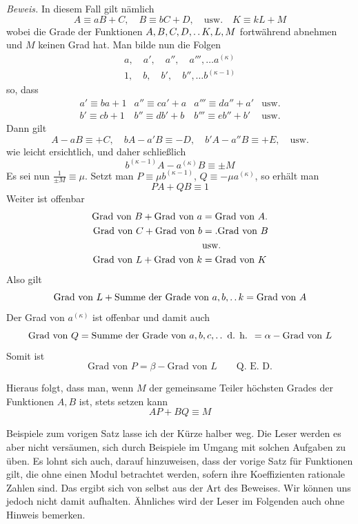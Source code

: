\emph{Beweis.} In diesem Fall gilt nämlich
\[
A\equiv aB+C,\quad B\equiv bC+D,\quad\text{usw.}\quad K\equiv kL+M
\]
wobei die Grade der Funktionen $A,B,C,D,\mathinner{.\,.} K,L,M$ fortwährend abnehmen und $M$ keinen Grad hat. Man bilde nun die Folgen
\[
\begin{gathered}
a,\quad a',\quad a'',\quad a''',\ldots a^{(\kappa)}\\
1,\quad b,\quad b',\quad b'',\ldots b^{(\kappa-1)}
\end{gathered}
\]
so, dass
\[
\begin{array}{llll}
a'\equiv ba+1&a''\equiv ca'+a&a'''\equiv da''+a'&\text{usw.}\\
b'\equiv cb+1&b''\equiv db'+b&b'''\equiv eb''+b'&\text{usw.}
\end{array}
\]
Dann gilt
\[
A-aB\equiv+C,\quad bA-a'B\equiv-D,\quad b'A-a''B\equiv+E,\quad\text{usw.}
\]
wie leicht ersichtlich, und daher schließlich
\[
b^{(\kappa-1)}A-a^{(\kappa)}B\equiv\pm M
\]
Es sei nun $\frac1{\pm M}\equiv\mu$. Setzt man $P\equiv\mu b^{(\kappa-1)}$, $Q\equiv-\mu a^{(\kappa)}$, so erhält man
\[
PA+QB\equiv1
\]
Weiter ist offenbar
\[
\begin{aligned}
\text{Grad von }B+\text{Grad von }a&=\text{Grad von }A.\\
\text{Grad von }C+\text{Grad von }b&=\mathbin{.}\text{Grad von }B\\
&\text{usw.}\\
\text{Grad von }L+\text{Grad von }k&=\text{Grad von }K
\end{aligned}
\]
Also gilt
\[
\text{Grad von }L+\text{Summe der Grade von }a,b,\mathinner{.\,.} k=\text{Grad von }A
\]
Der Grad von $a^{(\kappa)}$ ist offenbar und damit auch
\[
\text{Grad von }Q=\text{Summe der Grade von }a,b,c,\mathinner{.\,.}\text{ d. h. }=\alpha-\text{Grad von }L
\]
Somit ist
\[
\text{Grad von }P=\beta-\text{Grad von }L\qquad\text{Q. E. D.}
\]

Hieraus folgt, dass man, wenn $M$ der gemeinsame Teiler höchsten Grades der Funktionen $A,B$ ist, stets setzen kann
\[
AP+BQ\equiv M
\]

Beispiele zum vorigen Satz lasse ich der Kürze halber weg. Die Leser werden es aber nicht versäumen, sich durch Beispiele im Umgang mit solchen Aufgaben zu üben. Es lohnt sich auch, darauf hinzuweisen, dass der vorige Satz für Funktionen gilt, die ohne einen Modul betrachtet werden, sofern ihre Koeffizienten rationale Zahlen sind. Das ergibt sich von selbst aus der Art des Beweises. Wir können uns jedoch nicht damit aufhalten. Ähnliches wird der Leser im Folgenden auch ohne Hinweis bemerken.

